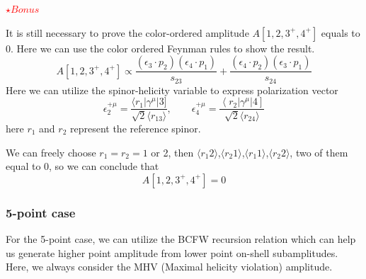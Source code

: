 \documentclass[12pt]{article}
\numberwithin{equation}{section}
\newcommand{\avg}[1]{\langle #1 \rangle}
\begin{document}
\textcolor{red}{$\star Bonus$}

It is still necessary to prove the color-ordered amplitude $A[1,2,3^+,4^+]$ equals to 0. Here we can use the color ordered Feynman rules to show the result.
\begin{equation*}
    A[1,2,3^+,4^+]\propto \frac{\left(\epsilon_3\cdot p_2\right)\left(\epsilon_4\cdot p_1\right)}{s_{23}}+\frac{\left(\epsilon_4\cdot p_2\right)\left(\epsilon_3\cdot p_1\right)}{s_{24}} 
\end{equation*}
Here we can utilize the spinor-helicity variable to express polarization vector
\begin{equation*}
    \epsilon_2^{+\mu}=\frac{\langle r_1 | \gamma^\mu | 3 ]}{\sqrt{2}\avg{r_13}},\qquad \epsilon_4^{+\mu}=\frac{\left <r_2|\gamma^\mu|4\right ]}{\sqrt{2}\avg{r_24}}
\end{equation*}
here $r_1$ and $r_2$ represent the reference spinor.

We can freely choose $r_1=r_2=1$ or 2, then $\avg{r_1 2}$,$\avg{r_2 1}$,$\avg{r_1 1}$,$\avg{r_2 2}$, two of them equal to 0, so we can conclude that
\begin{equation*}
    A[1,2,3^+,4^+]=0
\end{equation*}
\subsubsection{5-point case}
For the 5-point case, we can utilize the BCFW recursion relation which can help us generate higher point amplitude from lower point on-shell subamplitudes. Here, 
we always consider the MHV (Maximal helicity violation) amplitude. 
\end{document}
